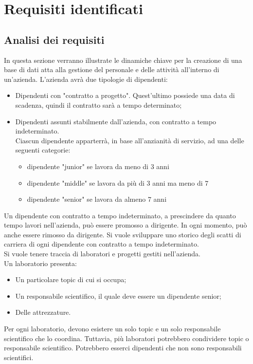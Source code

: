 \chapter{Requisiti identificati}
    \section{Analisi dei requisiti}
        In questa sezione verranno illustrate le dinamiche chiave per la creazione di una base di dati atta alla gestione del personale e delle attività all'interno di un'azienda. L'azienda avrà due tipologie di dipendenti:
        \begin{itemize}
            \item Dipendenti con "contratto a progetto". Quest'ultimo possiede una data di scadenza, quindi il contratto sarà a tempo determinato;
            \item Dipendenti assunti stabilmente dall'azienda, con contratto a tempo indeterminato.\\
            Ciascun dipendente apparterrà, in base all'anzianità di servizio, ad una delle seguenti categorie:
            \begin{itemize}
                \item dipendente "junior" se lavora da meno di 3 anni
                \item dipendente "middle" se lavora da più di 3 anni ma meno di 7
                \item dipendente "senior" se lavora da almeno 7 anni
            \end{itemize}
        \end{itemize}

        Un dipendente con contratto a tempo indeterminato, a prescindere da quanto tempo lavori nell'azienda, può essere promosso a dirigente. In ogni momento, può anche essere rimosso da dirigente.
        Si vuole sviluppare uno storico degli scatti di carriera di ogni dipendente con contratto a tempo indeterminato.\\
        
        \noindent Si vuole tenere traccia di laboratori e progetti gestiti nell'azienda.\\
        
        \noindent Un laboratorio presenta:
        \begin{itemize}
            \item Un particolare topic di cui si occupa;
            \item Un responsabile scientifico, il quale deve essere un dipendente senior;
            \item Delle attrezzature.
        \end{itemize}
        Per ogni laboratorio, devono esistere un solo topic e un solo responsabile scientifico che lo coordina.
        Tuttavia, più laboratori potrebbero condividere topic o responsabile scientifico. Potrebbero esserci dipendenti che non sono responsabili scientifici.
        
